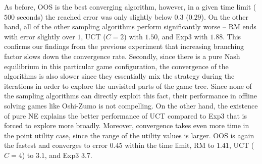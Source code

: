As before, OOS is the best converging algorithm, however, in a given time limit ($500$ seconds) the reached error was only slightly below $0.3$ ($0.29$). On the other hand, all of the other sampling algorithms perform significantly worse -- RM ends with error slightly over $1$, UCT ($C=2$) with $1.50$, and Exp3 with $1.88$.
This confirms our findings from the previous experiment that increasing branching factor slows down the convergence rate.
Secondly, since there is a pure Nash equilibrium in this particular game configuration, the convergence of the algorithms is also slower since they essentially mix the strategy during the iterations in order to explore the unvisited parts of the game tree. Since none of the sampling algorithms can directly exploit this fact, their performance in offline solving games like Oshi-Zumo is not compelling. On the other hand, the existence of pure NE explains the better performance of UCT compared to Exp3 that is forced to explore more broadly.
Moreover, convergence takes even more time in the point utility case, since the range of the utility values is larger.
OOS is again the fastest and converges to error $0.45$ within the time limit, RM to $1.41$, UCT ($C=4$) to $3.1$, and Exp3 $3.7$. 


